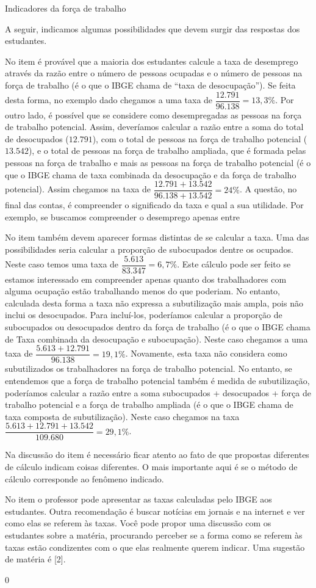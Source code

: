 \begin{answer}{Indicadores da força de trabalho}
{
  A seguir, indicamos algumas possibilidades que devem surgir das respostas dos estudantes.

  No item  é provável que a maioria dos estudantes calcule a taxa de desemprego através da razão entre o número de pessoas ocupadas e o número de pessoas na força de trabalho (é o que o IBGE chama de “taxa de desocupação”). Se feita desta forma, no exemplo dado chegamos a uma taxa de $\dfrac{12.791}{96.138}=13,3\%$. Por outro lado, é possível que se considere como desempregadas as pessoas na força de trabalho potencial. Assim, deveríamos calcular a razão entre a soma do total de desocupados ($12.791$), com o total de pessoas na força de trabalho potencial ($13.542$), e o total de pessoas na força de trabalho ampliada, que é formada pelas pessoas na força de trabalho e mais as pessoas na força de trabalho potencial (é o que o IBGE chama de taxa combinada da desocupação e da força de trabalho potencial). Assim chegamos na taxa de $\dfrac{12.791+13.542}{96.138+13.542}=24\%$. A questão, no final das contas, é compreender o significado da taxa e qual a sua utilidade. Por exemplo, se buscamos compreender o desemprego apenas entre

  No item  também devem aparecer formas distintas de se calcular a taxa. Uma das possibilidades seria calcular a proporção de subocupados dentre os ocupados. Neste caso temos uma taxa de $\dfrac{5.613}{83.347}=6,7\%$. Este cálculo pode ser feito se estamos interessado em compreender apenas quanto dos trabalhadores com alguma ocupação estão trabalhando menos do que poderiam. No entanto, calculada desta forma a taxa não expressa a subutilização mais ampla, pois não inclui os desocupados. Para incluí-los, poderíamos calcular a proporção de subocupados ou desocupados dentro da força de trabalho (é o que o IBGE chama de Taxa combinada da desocupação e subocupação). Neste caso chegamos a uma taxa de $\dfrac{5.613+12.791}{96.138}=19,1\%$. Novamente, esta taxa não considera como subutilizados os trabalhadores na força de trabalho potencial. No entanto, se entendemos que a força de trabalho potencial também é medida de subutilização, poderíamos calcular a razão entre a soma subocupados + desocupados + força de trabalho potencial e a força de trabalho ampliada (é o que o IBGE chama de taxa composta de subutilização). Neste caso chegamos na taxa $\dfrac{5.613+12.791+13.542}{109.680}=29,1\%$.

  Na discussão do item  é necessário ficar atento ao fato de que propostas diferentes de cálculo indicam coisas diferentes. O mais importante aqui é se o método de cálculo corresponde ao fenômeno indicado.

  No item  o professor pode apresentar as taxas calculadas pelo IBGE aos estudantes. Outra recomendação é buscar notícias em jornais e na internet e ver como elas se referem às taxas. Você pode propor uma discussão com os estudantes sobre a matéria, procurando perceber se a forma como se referem às taxas estão condizentes com o que elas realmente querem indicar. Uma sugestão de matéria é [2]. 

}{0}
\end{answer}
